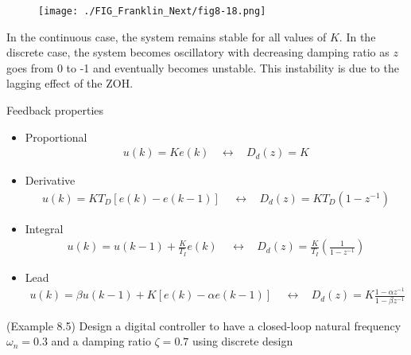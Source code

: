\documentclass[landscape,14pt]{oblivoir}
\begin{document}
\begin{figure}[h]
	\texttt{[image: ./FIG\_Franklin\_Next/fig8-18.png]}
\end{figure}

In the continuous case, the system remains stable for all values of $K$. 
In the discrete case, the system becomes oscillatory with decreasing damping ratio as $z$ goes from 0 to -1 and eventually becomes unstable. This instability is due to the lagging effect of the ZOH. 

%
\newpage
%
Feedback properties 
\begin{itemize}
	\item Proportional 
	\begin{align*}
		u(k) = Ke(k) ~~~~\leftrightarrow~~~~ D_d(z) = K 
	\end{align*}
	\item Derivative 
	\begin{align*}
		u(k) = K T_D [e(k) - e(k-1)] ~~~~~\leftrightarrow~~~~ D_d(z) = KT_D (1-z^{-1})
	\end{align*}
	\item Integral 
	\begin{align*}
		u(k) = u(k-1) + \frac{K}{T_I} e(k) ~~~~~\leftrightarrow~~~~ D_d(z) = \frac{K}{T_I} \left( \frac{1}{1-z^{-1}} \right) 
	\end{align*}
	\item Lead 
	\begin{align*}
		u(k) = \beta u(k-1) + K [e(k) - \alpha e(k-1)] ~~~~~\leftrightarrow~~~~ D_d(z) = K \frac{1- \alpha z^{-1}}{1-\beta z^{-1}} 
	\end{align*}
\end{itemize}
%
%
\newpage
%
%
\newpage
%
(Example 8.5)  Design a digital controller to have a closed-loop natural frequency $\omega_n = 0.3$ and a damping ratio $\zeta = 0.7$ using discrete design
\end{document}
